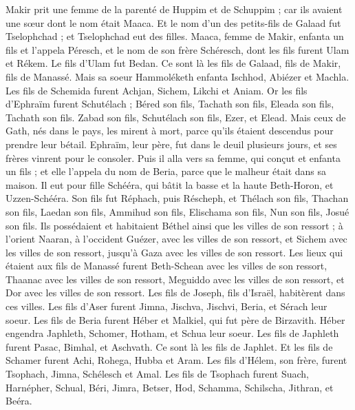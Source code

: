 \begin{multicols}{2}
Makir prit une femme de la parenté de Huppim et de Schuppim ; car ils avaient une sœur dont le nom était Maaca. Et le nom d'un des petits-fils de Galaad fut Tselophchad ; et Tselophchad eut des filles.
Maaca, femme de Makir, enfanta un fils et l'appela Péresch, et le nom de son frère Schéresch, dont les fils furent Ulam et Rékem.
Le fils d'Ulam fut Bedan. Ce sont là les fils de Galaad, fils de Makir, fils de Manassé.
Mais sa soeur Hammoléketh enfanta Ischhod, Abiézer et Machla.
Les fils de Schemida furent Achjan, Sichem, Likchi et Aniam.
Or les fils d'Ephraïm furent Schutélach ; Béred son fils, Tachath son fils, Eleada son fils, Tachath son fils.
Zabad son fils, Schutélach son fils, Ezer, et Elead. Mais ceux de Gath, nés dans le pays, les mirent à mort, parce qu'ils étaient descendus pour prendre leur bétail.
Ephraïm, leur père, fut dans le deuil plusieurs jours, et ses frères vinrent pour le consoler.
Puis il alla vers sa femme, qui conçut et enfanta un fils ; et elle l'appela du nom de Beria, parce que le malheur était dans sa maison.
Il eut pour fille Schééra, qui bâtit la basse et la haute Beth-Horon, et Uzzen-Schééra.
Son fils fut Réphach, puis Réscheph, et Thélach son fils, Thachan son fils,
Laedan son fils, Ammihud son fils, Elischama son fils,
Nun son fils, Josué son fils.
Ils possédaient et habitaient Béthel ainsi que les villes de son ressort ; à l'orient Naaran, à l'occident Guézer, avec les villes de son ressort, et Sichem avec les villes de son ressort, jusqu'à Gaza avec les villes de son ressort.
Les lieux qui étaient aux fils de Manassé furent Beth-Schean avec les villes de son ressort, Thaanac avec les villes de son ressort, Meguiddo avec les villes de son ressort, et Dor avec les villes de son ressort. Les fils de Joseph, fils d'Israël, habitèrent dans ces villes.
Les fils d'Aser furent Jimna, Jischva, Jischvi, Beria, et Sérach leur soeur.
Les fils de Beria furent Héber et Malkiel, qui fut père de Birzavith.
Héber engendra Japhleth, Schomer, Hotham, et Schua leur soeur.
Les fils de Japhleth furent Pasac, Bimhal, et Aschvath. Ce sont là les fils de Japhlet.
Et les fils de Schamer furent Achi, Rohega, Hubba et Aram.
Les fils d'Hélem, son frère, furent Tsophach, Jimna, Schélesch et Amal.
Les fils de Tsophach furent Suach, Harnépher, Schual, Béri, Jimra,
Betser, Hod, Schamma, Schilscha, Jithran, et Beéra.

\end{multicols}
